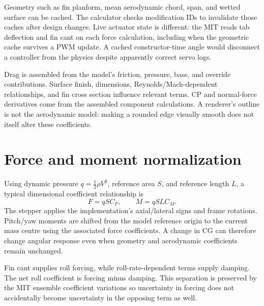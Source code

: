 Geometry such as fin planform, mean aerodynamic chord, span, and wetted surface can be cached. The calculator checks modification IDs to invalidate those caches after design changes. Live actuator state is different: the MIT  reads tab deflection and fin cant on each force calculation, including when the geometric cache survives a PWM update. A cached constructor-time angle would disconnect a controller from the physics despite apparently correct servo logs.

Drag is assembled from the model's friction, pressure, base, and override contributions. Surface finish, dimensions, Reynolds/Mach-dependent relationships, and fin cross section influence relevant terms. CP and normal-force derivatives come from the assembled component calculations. A renderer's outline is not the aerodynamic model: making a rounded edge visually smooth does not itself alter these coefficients.

\section{Force and moment normalization}
Using dynamic pressure \(q=\tfrac12\rho V^2\), reference area \(S\), and reference length \(L\), a typical dimensional coefficient relationship is
\begin{equation}
 F=qSC_F,\qquad M=qSLC_M.
\end{equation}
The stepper applies the implementation's axial/lateral signs and frame rotations. Pitch/yaw moments are shifted from the model reference origin to the current mass centre using the associated force coefficients. A change in CG can therefore change angular response even when geometry and aerodynamic coefficients remain unchanged.

Fin cant supplies roll forcing, while roll-rate-dependent terms supply damping. The net roll coefficient is forcing minus damping. This separation is preserved by the MIT ensemble coefficient variations so uncertainty in forcing does not accidentally become uncertainty in the opposing term as well.



